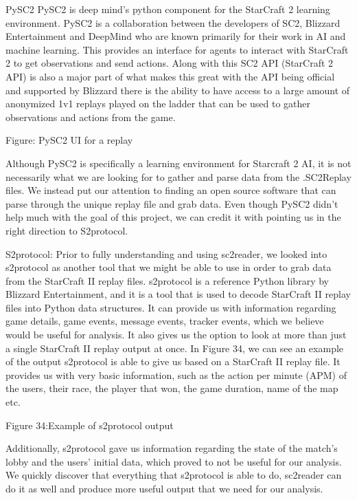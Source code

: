 \documentclass[a4paper,12pt]{report}
\begin{document}
PySC2
PySC2 is deep mind’s python component for the StarCraft 2 learning environment. PySC2 is a collaboration between the developers of SC2, Blizzard Entertainment and DeepMind who are known primarily for their work in AI and machine learning. This provides an interface for agents to interact with StarCraft 2 to get observations and send actions. Along with this SC2 API (StarCraft 2 API) is also a major part of what makes this great with the API being official and supported by Blizzard there is the ability to have access to a large amount of anonymized 1v1 replays played on the ladder that can be used to gather observations and actions from the game.

 
Figure: PySC2 UI for a replay

Although PySC2 is specifically a learning environment for Starcraft 2 AI, it is not necessarily what we are looking for to gather and parse data from the .SC2Replay files. We instead put our attention to finding an open source software that can parse through the unique replay file and grab data. Even though PySC2 didn’t help much with the goal of this project, we can credit it with pointing us in the right direction to S2protocol.

S2protocol:
Prior to fully understanding and using sc2reader, we looked into s2protocol as another tool that we might be able to use in order to grab data from the StarCraft II replay files. s2protocol is a reference Python library by Blizzard Entertainment, and it is a tool that is used to decode StarCraft II replay files into Python data structures. It can provide us with information regarding game details, game events, message events, tracker events, which we believe would be useful for analysis. It also gives us the option to look at more than just a single StarCraft II replay output at once. In Figure 34, we can see an example of the output s2protocol is able to give us based on a StarCraft II replay file. It provides us with very basic information, such as the action per minute (APM) of the users, their race, the player that won, the game duration, name of the map etc.


Figure 34:Example of s2protocol output

Additionally, s2protocol gave us information regarding the state of the match’s lobby and the users’ initial data, which proved to not be useful for our analysis. We quickly discover that everything that s2protocol is able to do, sc2reader can do it as well and produce more useful output that we need for our analysis. 
\end{document}
